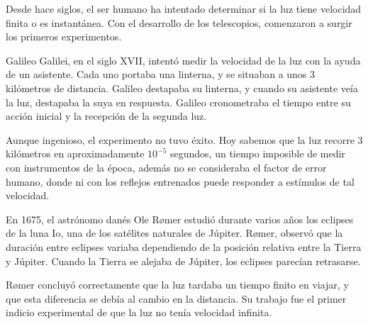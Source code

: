 \vspace{0.3cm}


Desde hace siglos, el ser humano ha intentado determinar si la luz tiene velocidad finita o es instantánea. Con el desarrollo de los telescopios, comenzaron a surgir los primeros experimentos.


Galileo Galilei, en el siglo XVII, intentó medir la velocidad de la luz con la ayuda de un asistente. Cada uno portaba una linterna, y se situaban a unos 3 kilómetros de distancia. Galileo destapaba su linterna, y cuando su asistente veía la luz, destapaba la suya en respuesta. Galileo cronometraba el tiempo entre su acción inicial y la recepción de la segunda luz.

Aunque ingenioso, el experimento no tuvo éxito. Hoy sabemos que la luz recorre 3 kilómetros en aproximadamente $10^{-5}$ segundos, un tiempo imposible de medir con instrumentos de la época, además no se consideraba el factor de error humano, donde ni con los reflejos entrenados puede responder a estímulos de tal velocidad.


\vspace{0.3cm}


En 1675, el astrónomo danés Ole Rømer estudió durante varios años los eclipses de la luna Io, una de los satélites naturales de Júpiter. Rømer, observó que la duración entre eclipses variaba dependiendo de la posición relativa entre la Tierra y Júpiter. Cuando la Tierra se alejaba de Júpiter, los eclipses parecían retrasarse.

Rømer concluyó correctamente que la luz tardaba un tiempo finito en viajar, y que esta diferencia se debía al cambio en la distancia. Su trabajo fue el primer indicio experimental de que la luz no tenía velocidad infinita.

